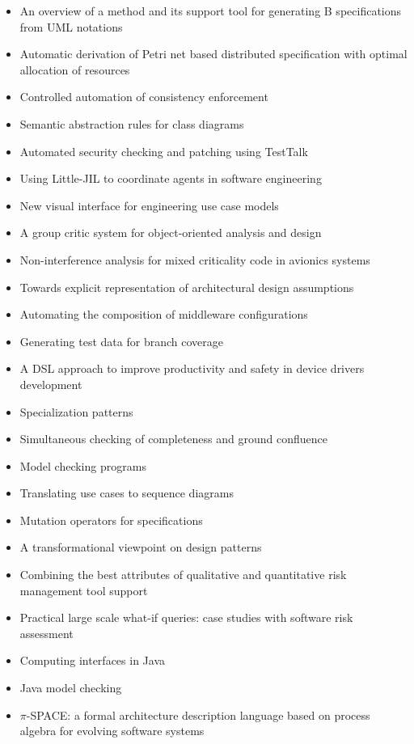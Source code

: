 {\small
\begin{itemize}[itemsep=-1ex]
  \item An overview of a method and its support tool for generating B specifications from UML notations
  \item Automatic derivation of Petri net based distributed specification with optimal allocation of resources
  \item Controlled automation of consistency enforcement
  \item Semantic abstraction rules for class diagrams
  \item Automated security checking and patching using TestTalk
  \item Using Little-JIL to coordinate agents in software engineering
  \item New visual interface for engineering use case models
  \item A group critic system for object-oriented analysis and design
  \item Non-interference analysis for mixed criticality code in avionics systems
  \item Towards explicit representation of architectural design assumptions
  \item Automating the composition of middleware configurations
  \item Generating test data for branch coverage
  \item A DSL approach to improve productivity and safety in device drivers development
  \item Specialization patterns
  \item Simultaneous checking of completeness and ground confluence
  \item Model checking programs
  \item Translating use cases to sequence diagrams
  \item Mutation operators for specifications
  \item A transformational viewpoint on design patterns
  \item Combining the best attributes of qualitative and quantitative risk management tool support
  \item Practical large scale what-if queries: case studies with software risk assessment
  \item Computing interfaces in Java
  \item Java model checking
  \item $\pi$-SPACE: a formal architecture description language based on process algebra for evolving software systems

\end{itemize}}
